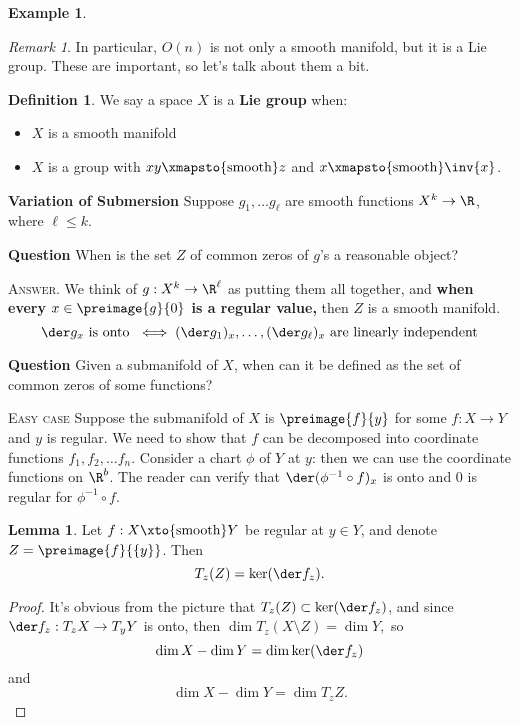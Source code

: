 \documentclass[a5paper]{article}
\theoremstyle{definition}%
\newtheorem{lemma}[theorem]{Lemma}
\newtheorem*{definition*}{Definition}
\newtheorem*{example*}{Example}
\numberwithin{exercise}{section}
\theoremstyle{remark}%
\newtheorem*{remark*}{Remark}
\renewcommand{\emph}{\textbf}
\begin{document}
\begin{example*}
\begin{remark*}
In particular, $O(n)$ is not only a smooth manifold, but it is a Lie group. These are important, so let's talk about them a bit. 
\end{remark*}

\begin{highlight}
\begin{definition*}
We say a space $X$ is a \emph{Lie group} when:	
	\begin{itemize}
	\item $X$ is a smooth manifold
	\item $X$ is a group with $xy\xmapsto{\text{smooth}} z$ and $x\xmapsto{\text{smooth}}\inv{x}$. 
	\end{itemize}
\end{definition*}
\end{highlight}

\pagebreak
\noindent\textbf{Variation of Submersion} Suppose $g_1, \dots g_\ell$ are smooth functions $X^k\to \R$, where $\ell\leq k$.

\noindent\textbf{Question} When is the set $Z$ of common zeros of $g$'s a reasonable object?

\noindent \textsc{Answer.} We think of $g:X^k\to\R^\ell$ as putting them all together, and\emph{ when every $x\in\preimage{g}{0}$ is a regular value,} then $Z$ is a smooth manifold.
$$\der g_x \text{ is onto } \iff (\der g_1)_x, \dots, (\der g_\ell)_x \text{ are linearly independent}
$$
\qedwhite

\noindent\textbf{Question} Given a submanifold of $X$, when can it be defined as the set of common zeros of some functions? 

\noindent\textsc{Easy case} Suppose the submanifold of $X$ is $\preimage{f}{y}$ for some $f:X\to Y$ and $y$ is regular. We need to show that $f$ can be decomposed into coordinate functions $f_1, f_2,\dots f_n$. Consider a chart $\phi$ of $Y$ at $y$:
then we can use the coordinate functions on $\R^b$. The reader can verify that $\der(\phi^{-1}\circ f)_x$ is onto and $0$ is regular for $\phi^{-1}\circ f$.
\end{example*}

\begin{highlight}
\begin{lemma}
Let $f:X\xto{\text{smooth}}Y$ be regular at $y\in Y$, and denote $Z=\preimage{f}{\{y\}}$. Then 
$$T_z(Z)=\ker(\der f_z).
$$
\end{lemma}
\end{highlight}
\begin{proof}\mbox{}
It's obvious from the picture that $T_z(Z)\subset\ker(\der f_z)$, and since $\der f_z:T_z X\to T_y Y$ is onto, then 
$\dim T_z(X\setminus Z) = \dim Y,$
so $$\dim X -  \dim Y=\dim \ker (\der f_z)$$ and 
$$\dim X -  \dim Y=\dim T_z Z.$$
\end{proof}
\end{document}
